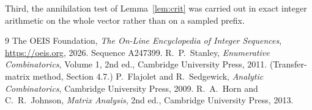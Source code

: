 \documentclass[11pt,a4paper]{article}
\theoremstyle{plain}
\theoremstyle{definition}
\begin{document}
Third, the annihilation test of Lemma~\ref{lem:crit} was carried out in exact integer
arithmetic on the whole vector rather than on a sampled prefix.

\begin{thebibliography}{9}
 The OEIS Foundation, \emph{The On-Line Encyclopedia of Integer
Sequences}, \url{https://oeis.org}, 2026. Sequence A247399.
 R.~P.~Stanley, \emph{Enumerative Combinatorics}, Volume 1, 2nd ed.,
Cambridge University Press, 2011. (Transfer-matrix method, Section 4.7.)
 P.~Flajolet and R.~Sedgewick, \emph{Analytic Combinatorics}, Cambridge
University Press, 2009.
 R.~A.~Horn and C.~R.~Johnson, \emph{Matrix Analysis}, 2nd ed., Cambridge
University Press, 2013.
\end{thebibliography}
\end{document}

